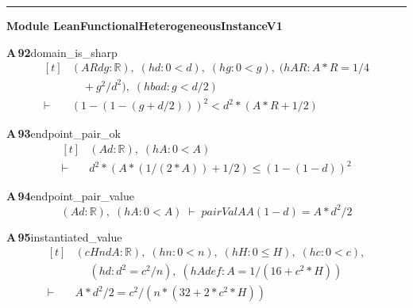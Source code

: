 \documentclass[conference]{IEEEtran}
\theoremstyle{definition}
\newcommand{\lean}[1]{\textsf{\footnotesize #1}}
\begin{document}
\vspace{4pt}\noindent\rule{\columnwidth}{0.4pt}\par\vspace{2pt}
\noindent\textbf{Module \lean{LeanFunctionalHeterogeneousInstanceV1}}\par\vspace{3pt}

\noindent\textbf{A\,92}\quad\lean{domain\_is\_sharp}
{\footnotesize\[ \begin{aligned}[t]
&(\mathit{A} \mathit{R} \mathit{d} \mathit{g} : \mathbb{R} ),\; (\mathit{hd} : 0 < \mathit{d}),\; (\mathit{hg} : 0 < \mathit{g}),\; (\mathit{hAR} : \mathit{A} * \mathit{R} = 1 / 4\\
&\quad + \mathit{g} ^{2} / \mathit{d} ^{2}),\; (\mathit{hbad} : \mathit{g} < \mathit{d} / 2)\\
\vdash\;&(1 - (1 - (\mathit{g} + \mathit{d} / 2))) ^{2} < \mathit{d} ^{2} * (\mathit{A} * \mathit{R} + 1 / 2)
\end{aligned} \]}

\noindent\textbf{A\,93}\quad\lean{endpoint\_pair\_ok}
{\footnotesize\[ \begin{aligned}[t]
&(\mathit{A} \mathit{d} : \mathbb{R} ),\; (\mathit{hA} : 0 < \mathit{A})\\
\vdash\;&\mathit{d} ^{2} * (\mathit{A} * (1 / (2 * \mathit{A})) + 1 / 2) \leq (1 - (1 - \mathit{d})) ^{2}
\end{aligned} \]}

\noindent\textbf{A\,94}\quad\lean{endpoint\_pair\_value}
{\footnotesize\[ (\mathit{A} \mathit{d} : \mathbb{R} ),\; (\mathit{hA} : 0 < \mathit{A}) \;\vdash\; \mathit{pairVal} \mathit{A} \mathit{A} (1 - \mathit{d}) = \mathit{A} * \mathit{d} ^{2} / 2 \]}

\noindent\textbf{A\,95}\quad\lean{instantiated\_value}
{\footnotesize\[ \begin{aligned}[t]
&(\mathit{c} \mathit{H} \mathit{n} \mathit{d} \mathit{A} : \mathbb{R} ),\; (\mathit{hn} : 0 < \mathit{n}),\; (\mathit{hH} : 0 \leq \mathit{H}),\; (\mathit{hc} : 0 < \mathit{c}),\\
&\quad \; (\mathit{hd} : \mathit{d} ^{2} = \mathit{c} ^{2} / \mathit{n}),\; (\mathit{hAdef} : \mathit{A} = 1 / (16 + \mathit{c} ^{2} * \mathit{H}))\\
\vdash\;&\mathit{A} * \mathit{d} ^{2} / 2 = \mathit{c} ^{2} / (\mathit{n} * (32 + 2 * \mathit{c} ^{2} * \mathit{H}))
\end{aligned} \]}
\end{document}
